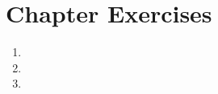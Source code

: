 \section*{Chapter Exercises}

\begin{exercisebox}
\begin{enumerate}
    \item %
    \item %
    \item %
\end{enumerate}
\end{exercisebox}

